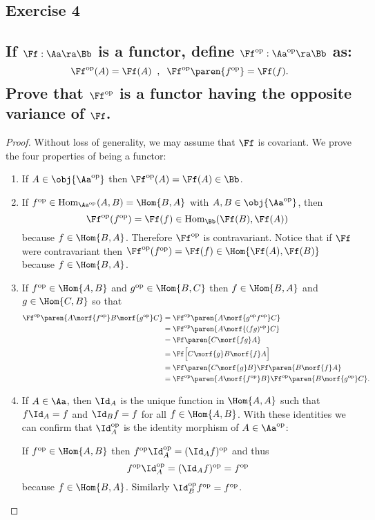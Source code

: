 \HRule
\subsection*{Exercise 4}
\subsection*{
If $\Ff:\Aa\ra\Bb$ is a functor, define $\Ff^{\text{op}}:\Aa^{\text{op}}\ra\Bb$ as:
\[
  \Ff^{\text{op}}(A)=\Ff(A) \;\;,\;\; \Ff^{\text{op}}\paren{f^{\text{op}}}=\Ff(f).
\]
Prove that $\Ff^{\text{op}}$ is a functor having the opposite variance of $\Ff$.
}

\begin{proof}%
  Without loss of generality, we may assume that $\Ff$ is covariant. We prove the four properties of
  being a functor:
\begin{enumerate}
\item If $A\in\obj{\Aa^{\text{op}}}$ then $\Ff^{\text{op}}(A)=\Ff(A)\in\Bb$. 
\item If $f^{\text{op}}\in\text{Hom}_{\Aa^{\text{op}}}(A,B)=\Hom{B,A}$ with $A,B\in\obj{\Aa^{\text{op}}}$,
  then %
  \[
    \Ff^{\text{op}}(f^{\text{op}})=\Ff(f)\in \text{Hom}_{\Bb}(\Ff(B),\Ff(A))
  \]
  because $f\in\Hom{B,A}$. Therefore $\Ff^{\text{op}}$ is contravariant. Notice that if $\Ff$ were
  contravariant then
$\Ff^{\text{op}}(f^{\text{op}})=\Ff(f)\in\Hom{\Ff(A),\Ff(B)}$ because $f\in\Hom{B,A}$.

\item If $f^{\text{op}}\in\Hom{A,B}$ and $g^{\text{op}}\in\Hom{B,C}$ then $f\in\Hom{B,A}$ and $g\in\Hom{C,B}$
so that
\begin{align*}%
	\Ff^{\text{op}}\paren{A\morf{f^{\text{op}}}B\morf{g^{\text{op}}}C}& =%
	\Ff^{\text{op}}\paren{A\morf{g^{\text{op}}f^{\text{op}}}C}\\ &=%
	\Ff^{\text{op}}\paren{A\morf{(fg)^{\text{op}}}C}\\ &=%
	\Ff\paren{C\morf{fg}A}\\ & =%
	\Ff\Big[C\morf{g}B\morf{f}A\Big]\\ &=%
	\Ff\paren{C\morf{g}B}\Ff\paren{B\morf{f}A}\\ & =%
	\Ff^{\text{op}}\paren{A\morf{f^{\text{op}}}B}\Ff^{\text{op}}\paren{B\morf{g^{\text{op}}}C}.%
\end{align*}
\item If $A\in\Aa$, then $\Id_A$ is the unique function in $\Hom{A,A}$ such that $f\Id_A=f$ and
$\Id_B f=f$ for all $f\in\Hom{A,B}$. With these identities we can confirm that $\Id_{A}^{\text{op}}$
is the identity morphism of $A\in\Aa^{\text{op}}$:

If $f^{\text{op}}\in\Hom{A,B}$ then $f^{\text{op}}\Id_A^{\text{op}}=(\Id_A f)^{\text{op}}$ and thus
\[
	f^{\text{op}}\Id_A^{\text{op}}=(\Id_A f)^{\text{op}}=f^{\text{op}}
\]
because $f\in\Hom{B,A}$. Similarly $\Id_B^{\text{op}}f^{\text{op}}=f^{\text{op}}$.
\end{enumerate}




%
\end{proof}%

